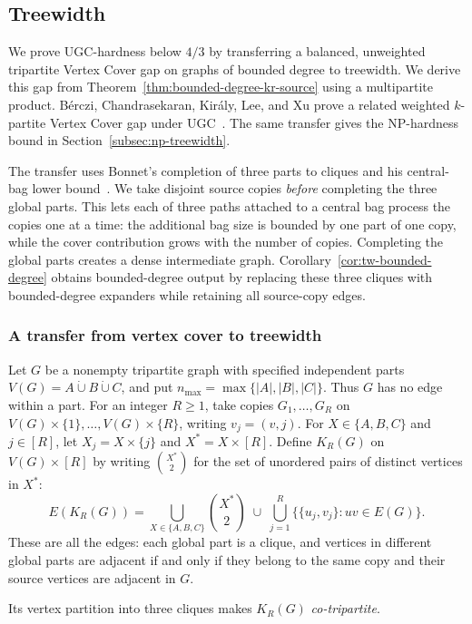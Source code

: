 \subsection{Treewidth}
\label{sec:tw-transfer}

We prove UGC-hardness below $4/3$ by transferring a balanced,
unweighted tripartite Vertex Cover gap on graphs of bounded degree
to treewidth. We derive this gap from
Theorem~\ref{thm:bounded-degree-kr-source} using a multipartite product.
B\'erczi, Chandrasekaran, Kir\'aly, Lee, and Xu prove a related weighted
$k$-partite Vertex Cover gap under UGC~\cite[Sections~3.5--3.6]{BCKLX2017}.
The same transfer gives the NP-hardness bound in
Section~\ref{subsec:np-treewidth}.

The transfer uses Bonnet's completion of three parts to cliques
and his central-bag lower bound~\cite[Lemma~6]{BonnetTreewidth}.
We take disjoint source copies \emph{before} completing the three global parts.
This lets each of three paths attached to a central bag process
the copies one at a time: the additional bag size is bounded by one part of one copy,
while the cover contribution grows with the number of copies.
Completing the global parts creates a dense intermediate graph.
Corollary~\ref{cor:tw-bounded-degree} obtains bounded-degree output
by replacing these three cliques with bounded-degree expanders while
retaining all source-copy edges.

\subsubsection{A transfer from vertex cover to treewidth}

Let $G$ be a nonempty tripartite graph with specified independent
parts $V(G)=A\mathbin{\dot\cup}B\mathbin{\dot\cup}C$, and put
$n_{\max}=\max\{|A|,|B|,|C|\}$. Thus $G$ has no edge within a part.
For an integer $R\ge1$, take copies $G_1,\ldots,G_R$ on
$V(G)\times\{1\},\ldots,V(G)\times\{R\}$, writing $v_j=(v,j)$.
For $X\in\{A,B,C\}$ and $j\in[R]$, let $X_j=X\times\{j\}$ and
$X^*=X\times[R]$. Define $K_R(G)$ on $V(G)\times[R]$ by
writing $\binom{X^*}{2}$ for the set of unordered pairs of distinct
vertices in $X^*$:
\[
 E(K_R(G))=
 \bigcup_{X\in\{A,B,C\}}\binom{X^*}{2}
 \;\cup\;\bigcup_{j=1}^R\{\{u_j,v_j\}:uv\in E(G)\}.
\]
These are all the edges: each global part is a
clique, and vertices in different global parts are adjacent if and only if
they belong to the same copy and their source vertices are
adjacent in $G$.

Its vertex partition into three cliques makes $K_R(G)$
\emph{co-tripartite}.

